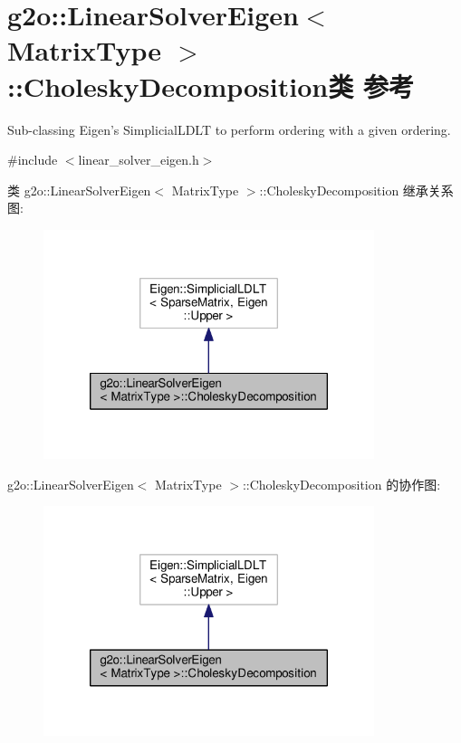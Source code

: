 \hypertarget{classg2o_1_1LinearSolverEigen_1_1CholeskyDecomposition}{\section{g2o\-:\-:Linear\-Solver\-Eigen$<$ Matrix\-Type $>$\-:\-:Cholesky\-Decomposition类 参考}
\label{classg2o_1_1LinearSolverEigen_1_1CholeskyDecomposition}
}


Sub-\/classing Eigen's Simplicial\-L\-D\-L\-T to perform ordering with a given ordering.  




{\ttfamily \#include $<$linear\-\_\-solver\-\_\-eigen.\-h$>$}



类 g2o\-:\-:Linear\-Solver\-Eigen$<$ Matrix\-Type $>$\-:\-:Cholesky\-Decomposition 继承关系图\-:
\nopagebreak
\begin{figure}[H]
\begin{center}
\leavevmode
\includegraphics[width=274pt]{classg2o_1_1LinearSolverEigen_1_1CholeskyDecomposition__inherit__graph}
\end{center}
\end{figure}


g2o\-:\-:Linear\-Solver\-Eigen$<$ Matrix\-Type $>$\-:\-:Cholesky\-Decomposition 的协作图\-:
\nopagebreak
\begin{figure}[H]
\begin{center}
\leavevmode
\includegraphics[width=274pt]{classg2o_1_1LinearSolverEigen_1_1CholeskyDecomposition__coll__graph}
\end{center}
\end{figure}
